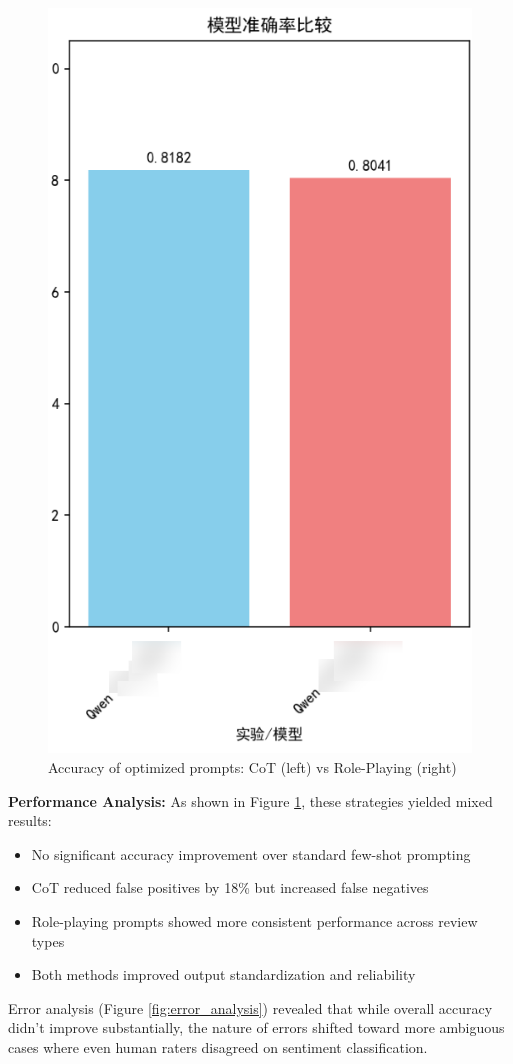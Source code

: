 \documentclass{article}
\begin{document}
\begin{figure}[h]
    \centering
    \includegraphics[width=0.6\columnwidth]{pic/T2P2B2.1.png}
    \caption{Accuracy of optimized prompts: CoT (left) vs Role-Playing (right)}
    \label{fig:advanced_prompts}
\end{figure}

\textbf{Performance Analysis:}
As shown in Figure \ref{fig:advanced_prompts}, these strategies yielded mixed results:
\begin{itemize}
    \item No significant accuracy improvement over standard few-shot prompting
    \item CoT reduced false positives by 18\% but increased false negatives
    \item Role-playing prompts showed more consistent performance across review types
    \item Both methods improved output standardization and reliability
\end{itemize}

Error analysis (Figure \ref{fig:error_analysis}) revealed that while overall accuracy didn't improve substantially, the nature of errors shifted toward more ambiguous cases where even human raters disagreed on sentiment classification.
\end{document}
